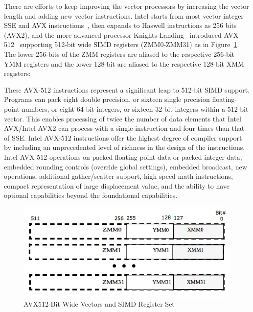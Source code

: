 \documentclass[sigconf,review]{acmart}
\begin{document}
There are efforts to keep improving the vector processors by increasing the vector
length and adding new vector instructions.
Intel starts from most vector integer SSE and AVX instructions~\cite{intel_sse, intel_avx, avxsets},
then expands to Haswell instructions as 256 bits (AVX2),
and the more advanced processor Knights Landing~\cite{avx-info} introduced
AVX-512~\cite{Intelref} supporting 512-bit wide SIMD registers (ZMM0-ZMM31)
as in Figure~\ref{fig:avx_mms}. The lower 256-bits of the ZMM registers are
aliased to the respective 256-bit YMM registers and the lower 128-bit are
aliased to the respective 128-bit XMM registers;
%

These AVX-512 instructions represent a significant leap to 512-bit SIMD support. Programs
can pack eight double precision, or sixteen single precision floating-point numbers,
or eight 64-bit integers, or sixteen 32-bit integers within a 512-bit vector.
This enables processing of twice the number of data elements that Intel AVX/Intel
AVX2 can process with a single instruction and four times than that of SSE.
%
Intel AVX-512 instructions offer the highest degree of compiler support by including
an unprecedented level of richness in the design of the instructions. Intel AVX-512
operations on packed floating point data or packed integer data, embedded
rounding controls (override global settings), embedded broadcast, new operations, additional
gather/scatter support, high speed math instructions, compact representation of
large displacement value, and the ability to have optional capabilities beyond
the foundational capabilities.

\begin{figure}[h]
    \centering
    \includegraphics[width=\linewidth]{avx_mms.png}
    \caption{AVX512-Bit Wide Vectors and SIMD Register Set}
    \label{fig:avx_mms}
\end{figure}
\end{document}
